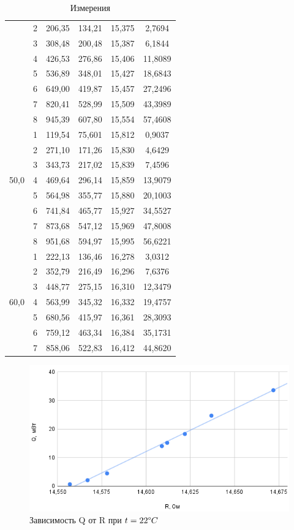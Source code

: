 \documentclass[a4paper,12pt]{article}
\begin{document}
\begin{table}[h]
\begin{tabular}{|c|c|c|c|c|c|}
          & 2 & 206,35 & 134,21 & 15,375 & 2,7694 \\ \cline{2-6}
          & 3 & 308,48 & 200,48 & 15,387 & 6,1844 \\ \cline{2-6}
          & 4 & 426,53 & 276,86 & 15,406 & 11,8089 \\ \cline{2-6}
          & 5 & 536,89 & 348,01 & 15,427 & 18,6843 \\ \cline{2-6}
          & 6 & 649,00 & 419,87 & 15,457 & 27,2496 \\ \cline{2-6}
          & 7 & 820,41 & 528,99 & 15,509 & 43,3989 \\ \cline{2-6}
          & 8 & 945,39 & 607,80 & 15,554 & 57,4608 \\ \hline
          \multirow{7}{*}{50,0} & 1 & 119,54 & 75,601 & 15,812 & 0,9037 \\ \cline{2-6}
          & 2 & 271,10 & 171,26 & 15,830 & 4,6429 \\ \cline{2-6}
          & 3 & 343,73 & 217,02 & 15,839 & 7,4596 \\ \cline{2-6}
          & 4 & 469,64 & 296,14 & 15,859 & 13,9079 \\ \cline{2-6}
          & 5 & 564,98 & 355,77 & 15,880 & 20,1003 \\ \cline{2-6}
          & 6 & 741,84 & 465,77 & 15,927 & 34,5527 \\ \cline{2-6}
          & 7 & 873,68 & 547,12 & 15,969 & 47,8008 \\ \cline{2-6}
          & 8 & 951,68 & 594,97 & 15,995 & 56,6221 \\ \hline
          \multirow{7}{*}{60,0} & 1 & 222,13 & 136,46 & 16,278 & 3,0312 \\ \cline{2-6}
          & 2 & 352,79 & 216,49 & 16,296 & 7,6376 \\ \cline{2-6}
          & 3 & 448,77 & 275,15 & 16,310 & 12,3479 \\ \cline{2-6}
          & 4 & 563,99 & 345,32 & 16,332 & 19,4757 \\ \cline{2-6}
          & 5 & 680,56 & 415,97 & 16,361 & 28,3093 \\ \cline{2-6}
          & 6 & 759,12 & 463,34 & 16,384 & 35,1731 \\ \cline{2-6}
          & 7 & 858,06 & 522,83 & 16,412 & 44,8620 \\ \hline
    \end{tabular}
    \caption{Измерения}
    \label{tab:my_label}
\end{table}
\newpage
\begin{figure}[h]
    \centering
    \includegraphics[width=0.7\linewidth]{t=22.png}
    \caption{Зависимость Q от R при $t=22\degree C$}
    \label{fig:my_label}
\end{figure}
\end{document}
